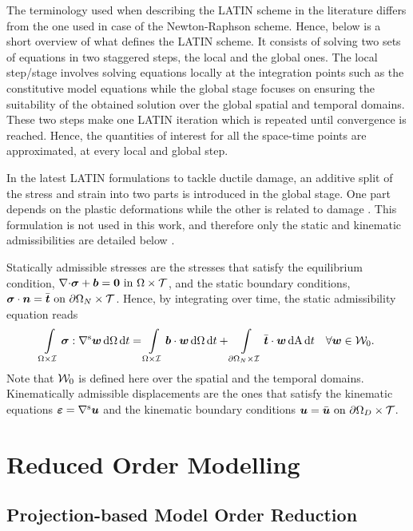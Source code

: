 The terminology used when describing the LATIN scheme in the literature differs from the one used in case of the Newton-Raphson scheme. Hence, below is a short overview of what defines the LATIN scheme. It consists of solving two sets of equations in two staggered steps, the local and the global ones. The local step/stage involves solving equations locally at the integration points such as the constitutive model equations while the global stage focuses on ensuring the suitability of the obtained solution over the global spatial and temporal domains. These two steps make one LATIN iteration which is repeated until convergence is reached. Hence, the quantities of interest for all the space-time points are approximated, at every local and global step.

In the latest LATIN formulations to tackle ductile damage, an additive split of the stress and strain into two parts is introduced in the global stage. One part depends on the plastic deformations while the other is related to damage \parencite{bhattacharyya2018model}. This formulation is not used in this work, and therefore only the static and kinematic admissibilities are detailed below \parencite[p:107]{wunderlich2002mechanics}.

Statically admissible stresses are the stresses that satisfy the equilibrium condition, ${\rm \nabla \cdot } \mbox{$\bm \sigma$}+\mbox{$\bm  b$}=\mbox{$\bm  0$} \text{ in } \Omega\times{\cal T}$, and the static boundary conditions, $\mbox{$\bm \sigma$} \cdot \mbox{$\bm  n$} = \bar{\mbox{$\bm  t$}} \text{ on } \partial \Omega_N\times{\cal T}$. Hence, by integrating  over time, the static admissibility equation reads
\begin{equation}
	\int \displaylimits_{\Omega \times {\cal I}} \mbox{$\bm \sigma$}:{\rm \nabla^s} \mbox{$\bm  w$} {\,\rm d} \Omega {\,\rm d} t= \int \displaylimits_{\Omega \times {\cal I}} \mbox{$\bm  b$} \cdot \mbox{$\bm  w$} {\,\rm d} \Omega {\,\rm d} t + \displaystyle \int \displaylimits_{\partial \Omega_N \times {\cal I} } \bar{\mbox{$\bm  t$}} \cdot \mbox{$\bm  w$} {\,\rm d} {\rm A} {\,\rm d} t \quad \forall \mbox{$\bm  w$} \in {\cal W}_0.
	\label{eq_weak_form_time}
\end{equation}
Note that ${\cal W}_0$ is defined here over the spatial and the temporal domains. Kinematically admissible displacements are the ones that satisfy the kinematic equations $\mbox{$\bm \varepsilon $} = {\rm \nabla^s} \mbox{$\bm  u$}$ and the kinematic boundary conditions $\mbox{$\bm  u$} = \bar{\mbox{$\bm  u$}} \text{ on } \partial \Omega_D\times{\cal T}$.

\section{Reduced Order Modelling}

\subsection{Projection-based Model Order Reduction}
\label{sec:POD}


